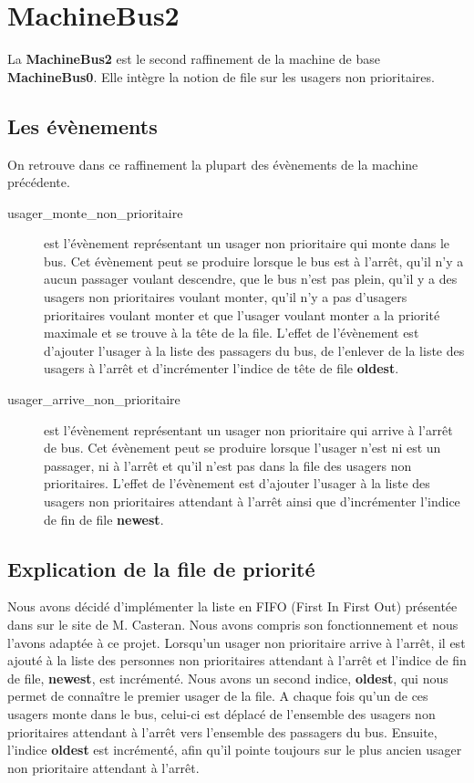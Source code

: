 \documentclass[a4paper,titlepage]{report}
\begin{document}
\newpage
\section{MachineBus2}	
	La \textbf{MachineBus2} est le second raffinement de la machine de base \textbf{MachineBus0}. Elle intègre la notion de file sur les usagers non prioritaires.\\

	\subsection{Les évènements}
		On retrouve dans ce raffinement la plupart des évènements de la machine précédente.\\
		
		\begin{description}
			\item[usager\_monte\_non\_prioritaire] est l'évènement représentant un usager non prioritaire qui monte dans le bus.
			Cet évènement peut se produire lorsque le bus est à l'arrêt, qu'il n'y a aucun passager voulant descendre, que le bus n'est pas plein, qu'il y a des usagers non prioritaires voulant monter, qu'il n'y a pas d'usagers prioritaires voulant monter et que l'usager voulant monter a la priorité maximale et se trouve à la tête de la file.
			L'effet de l'évènement est d'ajouter l'usager à la liste des passagers du bus, de l'enlever de la liste des usagers à l'arrêt et d'incrémenter l'indice de tête de file \textbf{oldest}.
			
			\item[usager\_arrive\_non\_prioritaire] est l'évènement représentant un usager non prioritaire qui arrive à l'arrêt de bus.
			Cet évènement peut se produire lorsque l'usager n'est ni est un passager, ni à l'arrêt et qu'il n'est pas dans la file des usagers non prioritaires.
			L'effet de l'évènement est d'ajouter l'usager à la liste des usagers non prioritaires attendant à l'arrêt ainsi que d'incrémenter l'indice de fin de file \textbf{newest}.

		\end{description}
		
	\subsection{Explication de la file de priorité}
		Nous avons décidé d'implémenter la liste en FIFO (First In First Out) présentée dans sur le site de M. Casteran. Nous avons compris son fonctionnement et nous l'avons adaptée à ce projet. Lorsqu'un usager non prioritaire arrive à l'arrêt, il est ajouté à la liste des personnes non prioritaires attendant à l'arrêt et l'indice de fin de file, \textbf{newest}, est incrémenté. Nous avons un second indice, \textbf{oldest}, qui nous permet de connaître le premier usager de la file. A chaque fois qu'un de ces usagers monte dans le bus, celui-ci est déplacé de l'ensemble des usagers non prioritaires attendant à l'arrêt vers l'ensemble des passagers du bus. Ensuite, l'indice \textbf{oldest} est incrémenté, afin qu'il pointe toujours sur le plus ancien usager non prioritaire attendant à l'arrêt.
		
\end{document}
